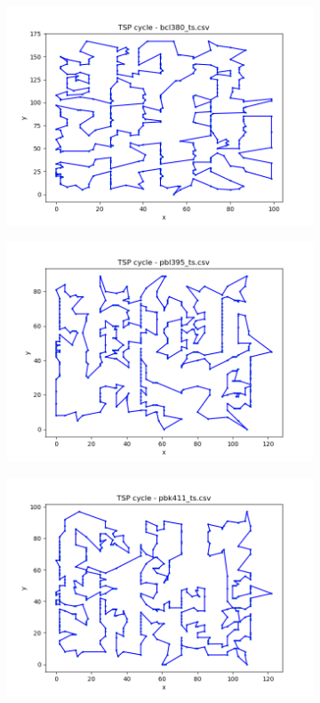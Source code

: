 \documentclass[12pt]{article}
\begin{document}
\begin{figure}[htpb]
\begin{subfigure}[b]{0.475\textwidth}
                \includegraphics[width=\linewidth]{img/bcl380_ts.png}
            \end{subfigure}
            \hfill
            \begin{subfigure}[b]{0.475\textwidth}
                \includegraphics[width=\linewidth]{img/pbl395_ts.png}
            \end{subfigure}
            \begin{subfigure}[b]{0.475\textwidth}
                \includegraphics[width=\linewidth]{img/pbk411_ts.png}

\end{subfigure}
\end{figure}
\end{document}
